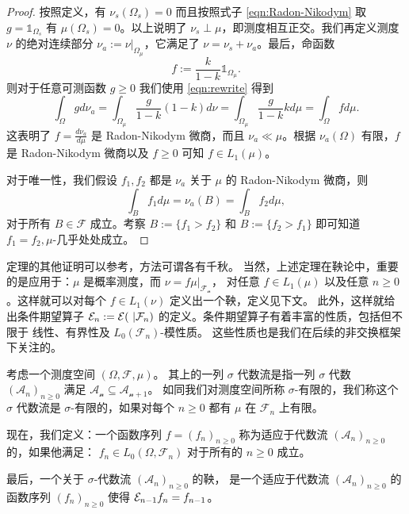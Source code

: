\begin{proof}
    按照定义，有 $\nu_s(\Omega_s)=0$ 而且按照式子 \eqref{eqn:Radon-Nikodym} 取 $g=\mathbb{1}_{\Omega_s}$ 有 $\mu(\Omega_s)=0$。以上说明了 $\nu_s\perp\mu$，即测度相互正交。我们再定义测度 $\nu$ 的绝对连续部分 $\nu_{a}:=\left.\nu\right|_{\Omega_\mu}$，它满足了 $\nu=\nu_s+\nu_a$。最后，命函数
        \[f:=\frac{k}{1-k}\mathbb{1}_{\Omega_\mu}.\]
    则对于任意可测函数 $g\geq0$ 我们使用 \eqref{eqn:rewrite} 得到
        \[\int_{\Omega} gd\nu_a=\int_{\Omega_\mu}\frac{g}{1-k}(1-k)d\nu=\int_{\Omega_\mu}\frac{g}{1-k}kd\mu=\int_{\Omega}fd\mu.\]
    这表明了 $f=\frac{d\nu_{a}}{d\mu}$ 是 Radon-Nikodym 微商，而且 $\nu_{a}\ll \mu$。根据 $\nu_a(\Omega)$ 有限，$f$ 是 Radon-Nikodym 微商以及 $f\geq0$ 可知 $f\in L_1(\mu)$。
    \par 对于唯一性，我们假设 $f_1,f_2$ 都是 $\nu_a$ 关于 $\mu$ 的 Radon-Nikodym 微商，则
        \[\int_B f_1d\mu=\nu_{a}(B)=\int_B f_2d\mu,\]
    对于所有 $B\in\mathcal{F}$ 成立。考察 $B:=\{f_1>f_2\}$ 和 $B:=\{f_2>f_1\}$ 即可知道 $f_1=f_2,\mu$-几乎处处成立。
\end{proof}

    定理的其他证明可以参考\cite*{david2018probability,folland1999real}，方法可谓各有千秋。
    当然，上述定理在鞅论中，重要的是应用于：$\mu$ 是概率测度，而 $\nu=\left.f\mu\right|_{\mathcal{F_n}}$，
    对任意 $f\in L_1(\mu)$ 以及任意 $n\geq0$。这样就可以对每个 $f\in L_1(\nu)$ 定义出一个鞅，定义见下文。
    此外，这样就给出条件期望算子 $\mathcal{E}_n:=\mathcal{E}(\ |\mathcal{F}_n)$ 的定义。条件期望算子有着丰富的性质，包括但不限于 线性、有界性及 $L_0(\mathcal{F}_n)$-模性质。
    这些性质也是我们在后续的非交换框架下关注的。
    \par 考虑一个测度空间 $(\Omega,\mathcal{F},\mu)$。
    其上的一列 $\sigma$ 代数流是指一列 $\sigma$ 代数 $(\mathcal{A}_n)_{n\geq0}$ 满足 $\mathcal{A_n}\subseteq \mathcal{A_{n+1}}$。
    如同我们对测度空间所称 $\sigma$-有限的，我们称这个 $\sigma$ 代数流是 $\sigma$-有限的，如果对每个 $n\geq0$ 都有 $\mu$ 在 $\mathcal{F}_n$ 上有限。
    
    \par 现在，我们定义：一个函数序列 $f=(f_n)_{n\geq0}$ 称为适应于代数流 $(\mathcal{A}_n)_{n\geq0}$ 的，如果他满足：
    $f_n\in L_0(\Omega,\mathcal{F}_n)$ 对于所有的 $n\geq0$ 成立。
    \par 最后，一个关于 $\sigma$-代数流 $(\mathcal{A}_n)_{n\geq0}$ 的鞅， 是一个适应于代数流 $(\mathcal{A}_n)_{n\geq0}$ 的函数序列 $(f_n)_{n\geq0}$ 使得 $\mathcal{E}_{n-1} f_n=f_{n-1}$。

